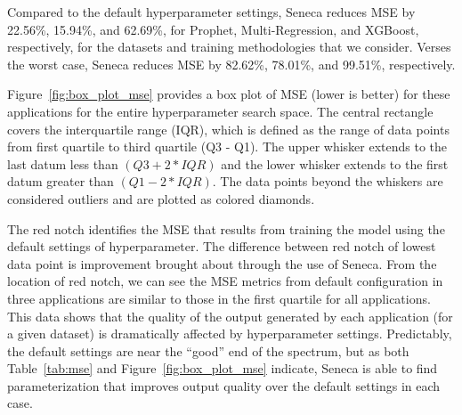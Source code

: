 %

Compared to the default hyperparameter settings,
Seneca reduces MSE by 22.56\%, 15.94\%, and 62.69\%, for Prophet, Multi-Regression, and XGBoost, respectively, for the datasets and training methodologies that we consider.
Verses the worst case, Seneca reduces MSE by 82.62\%, 78.01\%, and 99.51\%, respectively.

Figure~\ref{fig:box_plot_mse} provides a box plot of MSE (lower is better) for
these applications for the entire hyperparameter search space. The central
rectangle covers the interquartile range (IQR), which is defined as the range
of data points from first quartile to third quartile (Q3 - Q1).  The upper
whisker extends to the last datum less than \texttt{$(Q3 + 2 * IQR)$} and the
lower whisker extends to the first datum greater than \texttt{$(Q1 - 2 *
IQR)$}. The data points beyond the whiskers are considered outliers and are
plotted as colored diamonds. 

The red notch identifies the MSE that results
from training the model using the default settings of hyperparameter. The
difference between red notch of lowest data point is improvement brought about
through the use of Seneca. From the location of red notch, we can see the MSE
metrics from default configuration in three applications are similar to those
in the first quartile for all applications.
This data shows that the quality of the
output generated by each application (for a given dataset) is dramatically
affected by hyperparameter settings.  Predictably, the default settings are
near the ``good'' end of the spectrum, but as both Table~\ref{tab:mse} and
Figure~\ref{fig:box_plot_mse} indicate, Seneca is able to find
parameterization that improves output quality over the default settings
in each case.

